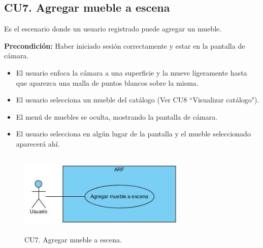 \subsection{CU7. Agregar mueble a escena}\par
Es el escenario donde un usuario registrado puede agregar un mueble.\par
\textbf{Precondición:} Haber iniciado sesión correctamente y estar en la pantalla de cámara.\par
\begin{itemize}
	\item El usuario enfoca la cámara a una superficie y la mueve ligeramente hasta que aparezca una malla de puntos blancos sobre la misma.
	\item El usuario selecciona un mueble del catálogo (Ver CU8 ``Visualizar catálogo").
	\item El menú de muebles se oculta, mostrando la pantalla de cámara.
	\item El usuario selecciona en algún lugar de la pantalla y el mueble seleccionado aparecerá ahí.
\end{itemize}

\begin{figure}[!htbp]
	\centering
	\includegraphics[width=8cm,height=4cm]{imagenes/analisis/cu/agregar_mueble.jpg}
	\caption{CU7. Agregar mueble a escena.}
	\label{fig:agregarmueble}
\end{figure} 

